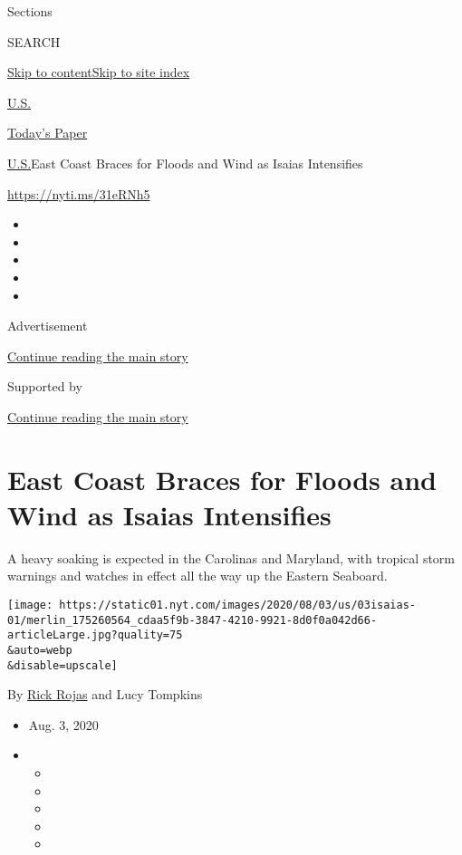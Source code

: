 Sections

SEARCH

\protect\hyperlink{site-content}{Skip to
content}\protect\hyperlink{site-index}{Skip to site index}

\href{https://www.nytimes.com/section/us}{U.S.}

\href{https://myaccount.nytimes.com/auth/login?response_type=cookie\&client_id=vi}{}

\href{https://www.nytimes.com/section/todayspaper}{Today's Paper}

\href{/section/us}{U.S.}\textbar{}East Coast Braces for Floods and Wind
as Isaias Intensifies

\url{https://nyti.ms/31eRNh5}

\begin{itemize}
\item
\item
\item
\item
\item
\end{itemize}

Advertisement

\protect\hyperlink{after-top}{Continue reading the main story}

Supported by

\protect\hyperlink{after-sponsor}{Continue reading the main story}

\hypertarget{east-coast-braces-for-floods-and-wind-as-isaias-intensifies}{%
\section{East Coast Braces for Floods and Wind as Isaias
Intensifies}\label{east-coast-braces-for-floods-and-wind-as-isaias-intensifies}}

A heavy soaking is expected in the Carolinas and Maryland, with tropical
storm warnings and watches in effect all the way up the Eastern
Seaboard.

\texttt{[image: https://static01.nyt.com/images/2020/08/03/us/03isaias-01/merlin\_175260564\_cdaa5f9b-3847-4210-9921-8d0f0a042d66-articleLarge.jpg?quality=75\\\&auto=webp\\\&disable=upscale]}

By \href{https://www.nytimes.com/by/rick-rojas}{Rick Rojas} and Lucy
Tompkins

\begin{itemize}
\item
  Aug. 3, 2020
\item
  \begin{itemize}
  \item
  \item
  \item
  \item
  \item
  \end{itemize}
\end{itemize}

